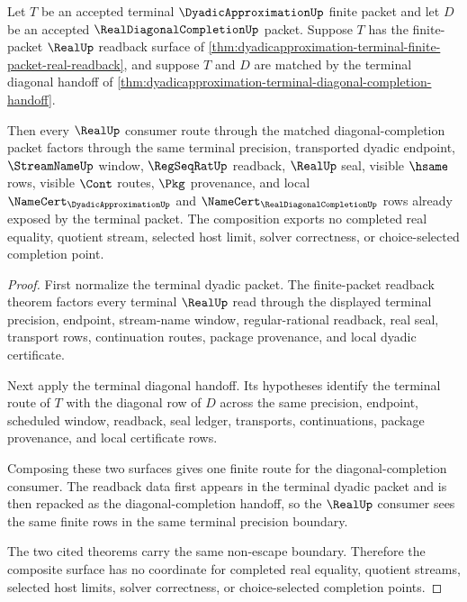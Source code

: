 \begin{theorem}
\label{thm:dyadicapproximation-terminal-diagonal-readback-composition}
Let $T$ be an accepted terminal $\DyadicApproximationUp$ finite packet and let $D$ be an accepted $\RealDiagonalCompletionUp$ packet. Suppose $T$ has the finite-packet $\RealUp$ readback surface of \autoref{thm:dyadicapproximation-terminal-finite-packet-real-readback}, and suppose $T$ and $D$ are matched by the terminal diagonal handoff of \autoref{thm:dyadicapproximation-terminal-diagonal-completion-handoff}.

Then every $\RealUp$ consumer route through the matched diagonal-completion packet factors through the same terminal precision, transported dyadic endpoint, $\StreamNameUp$ window, $\RegSeqRatUp$ readback, $\RealUp$ seal, visible $\hsame$ rows, visible $\Cont$ routes, $\Pkg$ provenance, and local $\NameCert_{\DyadicApproximationUp}$ and $\NameCert_{\RealDiagonalCompletionUp}$ rows already exposed by the terminal packet. The composition exports no completed real equality, quotient stream, selected host limit, solver correctness, or choice-selected completion point.
\end{theorem}
\begin{proof}
First normalize the terminal dyadic packet. The finite-packet readback theorem factors every terminal $\RealUp$ read through the displayed terminal precision, endpoint, stream-name window, regular-rational readback, real seal, transport rows, continuation routes, package provenance, and local dyadic certificate.

Next apply the terminal diagonal handoff. Its hypotheses identify the terminal route of $T$ with the diagonal row of $D$ across the same precision, endpoint, scheduled window, readback, seal ledger, transports, continuations, package provenance, and local certificate rows.

Composing these two surfaces gives one finite route for the diagonal-completion consumer. The readback data first appears in the terminal dyadic packet and is then repacked as the diagonal-completion handoff, so the $\RealUp$ consumer sees the same finite rows in the same terminal precision boundary.

The two cited theorems carry the same non-escape boundary. Therefore the composite surface has no coordinate for completed real equality, quotient streams, selected host limits, solver correctness, or choice-selected completion points.
\end{proof}
